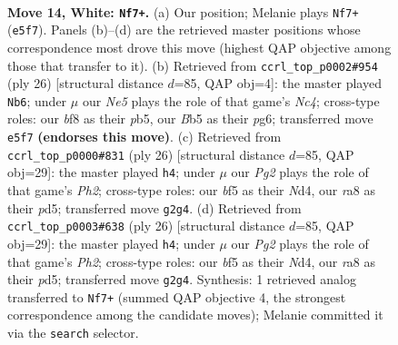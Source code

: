 \documentclass[11pt]{article}
\begin{document}
\clearpage

\begin{figure}[p]\centering
\begin{subfigure}{0.46\textwidth}\centering
\resizebox{\linewidth}{!}{%
\newchessgame
\chessboard[
  setfen={rn1k1bnr/pp5p/4p3/1B1pNbp1/3p4/N7/P1P2PPP/2R1K2R w K - 0 14},
  showmover=false,
  pgfstyle=straightmove, color=movearrow, markmove={e5-f7}
]}
\caption{}
\end{subfigure}\hfill
\begin{subfigure}{0.46\textwidth}\centering
\resizebox{\linewidth}{!}{%
\newchessgame
\chessboard[
  setfen={r3k1nr/2B2p1p/p5p1/1pp5/2NbP3/8/PP3PPP/3RK2R w Kkq - 0 14},
  showmover=false,
  pgfstyle=straightmove, color=movearrow, markmove={c4-b6}
]}
\caption{}
\end{subfigure}
\\[4pt]
\begin{subfigure}{0.46\textwidth}\centering
\resizebox{\linewidth}{!}{%
\newchessgame
\chessboard[
  setfen={r1b4r/pp1nkppp/4p3/3pP3/3N1P2/8/PPP3PP/R3KB1R w KQ - 1 14},
  showmover=false,
  pgfstyle=straightmove, color=movearrow, markmove={h2-h4}
]}
\caption{}
\end{subfigure}\hfill
\begin{subfigure}{0.46\textwidth}\centering
\resizebox{\linewidth}{!}{%
\newchessgame
\chessboard[
  setfen={r1b4r/pp1nkppp/4p3/3pP3/3N1P2/8/PPP3PP/R3KB1R w KQ - 1 14},
  showmover=false,
  pgfstyle=straightmove, color=movearrow, markmove={h2-h4}
]}
\caption{}
\end{subfigure}
\caption{\textbf{Move 14, White: \texttt{Nf7+}.} (a) Our position; Melanie plays \texttt{Nf7+} (\texttt{e5f7}). Panels (b)--(d) are the retrieved master positions whose correspondence most drove this move (highest QAP objective among those that transfer to it). (b) Retrieved from \texttt{ccrl\_top\_p0002\#954} (ply 26) [structural distance $d$=85, QAP obj=4]: the master played \texttt{Nb6}; under $\mu$ our \emph{Ne5} plays the role of that game's \emph{Nc4}; cross-type roles: our \emph{b}f8 as their \emph{p}b5, our \emph{B}b5 as their \emph{p}g6; transferred move \texttt{e5f7} \textbf{(endorses this move)}. (c) Retrieved from \texttt{ccrl\_top\_p0000\#831} (ply 26) [structural distance $d$=85, QAP obj=29]: the master played \texttt{h4}; under $\mu$ our \emph{Pg2} plays the role of that game's \emph{Ph2}; cross-type roles: our \emph{b}f5 as their \emph{N}d4, our \emph{r}a8 as their \emph{p}d5; transferred move \texttt{g2g4}. (d) Retrieved from \texttt{ccrl\_top\_p0003\#638} (ply 26) [structural distance $d$=85, QAP obj=29]: the master played \texttt{h4}; under $\mu$ our \emph{Pg2} plays the role of that game's \emph{Ph2}; cross-type roles: our \emph{b}f5 as their \emph{N}d4, our \emph{r}a8 as their \emph{p}d5; transferred move \texttt{g2g4}. Synthesis: 1 retrieved analog transferred to \texttt{Nf7+} (summed QAP objective 4, the strongest correspondence among the candidate moves); Melanie committed it via the \texttt{search} selector.}
\label{fig:thought-m26}
\end{figure}
\end{document}
